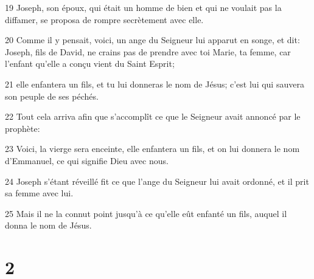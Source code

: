 \par 19 Joseph, son époux, qui était un homme de bien et qui ne voulait pas la diffamer, se proposa de rompre secrètement avec elle.
\par 20 Comme il y pensait, voici, un ange du Seigneur lui apparut en songe, et dit: Joseph, fils de David, ne crains pas de prendre avec toi Marie, ta femme, car l'enfant qu'elle a conçu vient du Saint Esprit;
\par 21 elle enfantera un fils, et tu lui donneras le nom de Jésus; c'est lui qui sauvera son peuple de ses péchés.
\par 22 Tout cela arriva afin que s'accomplît ce que le Seigneur avait annoncé par le prophète:
\par 23 Voici, la vierge sera enceinte, elle enfantera un fils, et on lui donnera le nom d'Emmanuel, ce qui signifie Dieu avec nous.
\par 24 Joseph s'étant réveillé fit ce que l'ange du Seigneur lui avait ordonné, et il prit sa femme avec lui.
\par 25 Mais il ne la connut point jusqu'à ce qu'elle eût enfanté un fils, auquel il donna le nom de Jésus.

\chapter{2}

